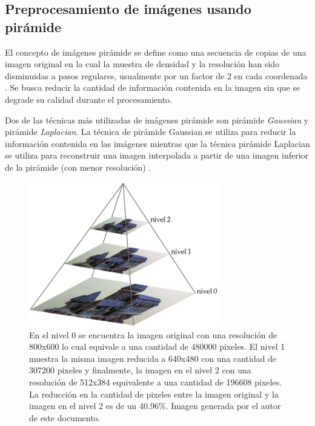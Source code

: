 \subsection{Preprocesamiento de im\'{a}genes usando pir\'{a}mide}
El concepto de im\'{a}genes pir\'{a}mide se define como una secuencia de copias de una imagen original en la cual la muestra de densidad y la resoluci\'{o}n han sido disminuidas a pasos regulares, usualmente por un factor de 2 en cada coordenada \cite{Adelson_Anderson_Bergen_Burt_Ogden_1984}. Se busca reducir la cantidad de informaci\'{o}n contenida en la imagen sin que se degrade su calidad durante el procesamiento.

Dos de las t\'{e}cnicas m\'{a}s utilizadas de im\'{a}genes pir\'{a}mide son pir\'{a}mide \textit{Gaussian} y pir\'{a}mide \textit{Laplacian}. La t\'{e}cnica de pir\'{a}mide Gaussian se utiliza para reducir la informaci\'{o}n contenida en las im\'{a}genes mientras que la t\'{e}cnica pir\'{a}mide Laplacian se utiliza para reconstruir una imagen interpolada a partir de una imagen inferior de la pir\'{a}mide (con menor resoluci\'{o}n) \cite{Burt198120,burt_adelson_1095851}.


\begin{figure}[H]
\centering
\includegraphics[width=0.75\textwidth]{images/pyramid.png}
\caption[Preprocesamiento de im\'{a}genes usando pir\'{a}mide]%
{En el nivel 0 se encuentra la imagen original con una resoluci\'{o}n de 800x600 lo cual equivale a una cantidad de 480000 pixeles. El nivel 1 muestra la misma imagen reducida a 640x480 con una cantidad de 307200 pixeles y finalmente, la imagen en el nivel 2 con una resoluci\'{o}n de 512x384 equivalente a una cantidad de 196608 pixeles. La reducci\'{o}n en la cantidad de pixeles entre la imagen original y la imagen en el nivel 2 es de un 40.96\%. Imagen generada por el autor de este documento.}
\label{fig:Pyramid}
\end{figure}



